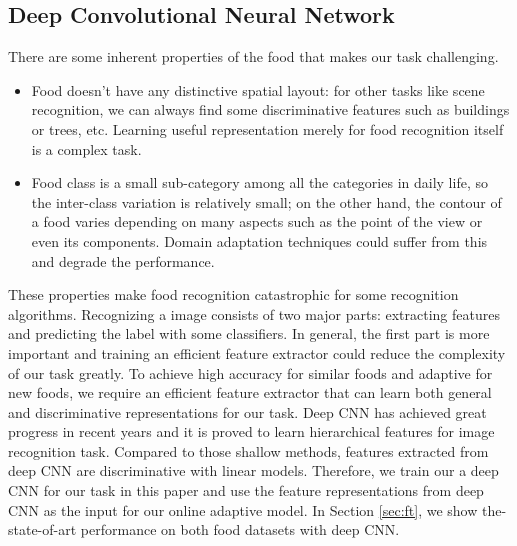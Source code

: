 \subsection{Deep Convolutional Neural Network} 
There are some inherent properties of the food that makes our task challenging.
\begin{itemize}
  \item Food doesn't have any distinctive spatial layout: for other tasks like scene recognition, we can always find some discriminative features such as buildings or trees, etc. Learning useful representation merely for food recognition itself is a complex task.
  \item Food class is a small sub-category among all the categories in daily life, so the inter-class variation is relatively small; on the other hand, the contour of a food varies depending on many aspects such as the point of the view or even its components. Domain adaptation techniques could suffer from this and degrade the performance.
\end{itemize}
These properties make food recognition catastrophic for some recognition algorithms. Recognizing a image consists of two major parts: extracting features and predicting the label with some classifiers. In general, the first part is more important and training an efficient feature extractor could reduce the complexity of our task greatly. To achieve high accuracy for similar foods and adaptive for new foods, we require an efficient feature extractor that can learn both general and discriminative representations for our task. Deep CNN has achieved great progress in recent years and it is proved to learn hierarchical features for image recognition task\cite{zeiler2010deconvolutional}. Compared to those shallow methods, features extracted from deep CNN are discriminative with linear models. Therefore, we train our a deep CNN for our task in this paper and use the feature representations from deep CNN as the input for our online adaptive model. In Section \ref{sec:ft}, we show the-state-of-art performance on both food datasets with deep CNN.

